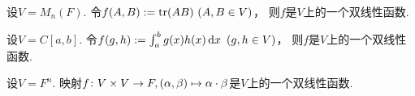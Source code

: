 \begin{example}\label{example:双线性函数.例1}
设\(V = M_n(F)\).
令\(f(A,B) := \tr(AB)\ (A,B \in V)\)，
则\(f\)是\(V\)上的一个双线性函数.
\end{example}

\begin{example}\label{example:双线性函数.例2}
设\(V = C[a,b]\).
令\(f(g,h) \defeq \int_a^b g(x) h(x) \dd{x}\ (g,h \in V)\)，
则\(f\)是\(V\)上的一个双线性函数.
\end{example}

\begin{example}\label{example:双线性函数.例3}
设\(V = F^n\).
映射\(f\colon V \times V \to F,
(\alpha,\beta) \mapsto \alpha\cdot\beta\)是\(V\)上的一个双线性函数.
\end{example}

